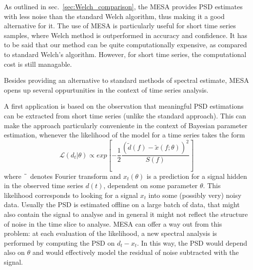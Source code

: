 \documentclass[twocolumn,showpacs,preprintnumbers,nofootinbib,prd,
superscriptaddress,10pt]{revtex4-1}
\begin{document}
As outlined in sec.~\ref{sec:Welch_comparison}, the MESA provides PSD estimates with less noise than the standard Welch algorithm, thus making it a good alternative for it. The use of MESA is particularly useful for short time series samples, where Welch method is outperformed in accuracy and confidence.
It has to be said that our method can be quite computationally expensive, as compared to standard Welch's algorithm. However, for short time series, the computational cost is still managable.

Besides providing an alternative to standard methods of spectral estimate, MESA opens up several oppurtunities in the context of time series analysis.

A first application is based on the observation that meaningful PSD estimations can be extracted from short time series (unlike the standard approach).
This can make the approach particularly conveniente in the context of Bayesian parameter estimation, whenever the likelihood of the model for a time series takes the form
\begin{equation}
	\mathcal{L}(d_t | \theta) \propto exp\left[ -\frac{1}{2} \frac{(\tilde{d}(f)- \tilde{x}(f;\theta))^2}{S(f)} \right]
\end{equation}
where $\tilde{\hphantom{a}}$ denotes Fourier transform and $x_t(\theta)$ is a prediction for a signal hidden in the observed time series $d(t)$, dependent on some parameter $\theta$.
This likelihood corresponds to looking for a signal $x_t$ into some (possibly very) noisy data.
Usually the PSD is estimated offline on a large batch of data, that might also contain the signal to analyse and in general it might not reflect the structure of noise in the time slice to analyse.
MESA can offer a way out from this problem: at each evaluation of the likelihood, a new spectral analysis is performed by computing the PSD on $d_t-x_t$.
In this way, the PSD would depend also on $\theta$ and would effectively model the residual of noise subtracted with the signal.
\end{document}
